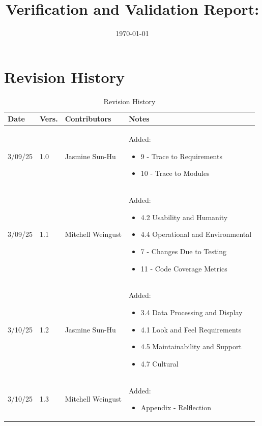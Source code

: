 \documentclass[12pt, titlepage]{article}
\begin{document}
\title{Verification and Validation Report: \progname} 
\author{\authname}
\date{\today}
	
\maketitle


\section{Revision History}

\begin{table}[hp]
  \caption{Revision History} \label{TblRevisionHistory}
  \begin{tabularx}{\textwidth}{p{1.5cm}p{1cm}p{3.5cm}X}
  \toprule {\textbf{Date}} & {\textbf{Vers.}} & {\textbf{Contributors}} & {\textbf{Notes}}\\
  \midrule
  3/09/25 & 1.0 & Jasmine Sun-Hu & Added:\begin{itemize}[leftmargin=*]
    \item 9 - Trace to Requirements
    \item 10 - Trace to Modules
    \end{itemize}\\
  3/09/25 & 1.1 & Mitchell Weingust & Added:\begin{itemize}[leftmargin=*]
    \item 4.2 Usability and Humanity
    \item 4.4 Operational and Environmental
    \item 7 - Changes Due to Testing
    \item 11 - Code Coverage Metrics
  \end{itemize}\\
  3/10/25 & 1.2 & Jasmine Sun-Hu & Added:\begin{itemize}[leftmargin=*]
    \item 3.4 Data Processing and Display
    \item 4.1 Look and Feel Requirements
    \item 4.5 Maintainability and Support
    \item 4.7 Cultural
  \end{itemize}\\
  3/10/25 & 1.3 & Mitchell Weingust & Added:\begin{itemize}[leftmargin=*]
    \item Appendix - Relflection
  \end{itemize}\\

\end{tabularx}
\end{table}
\end{document}
